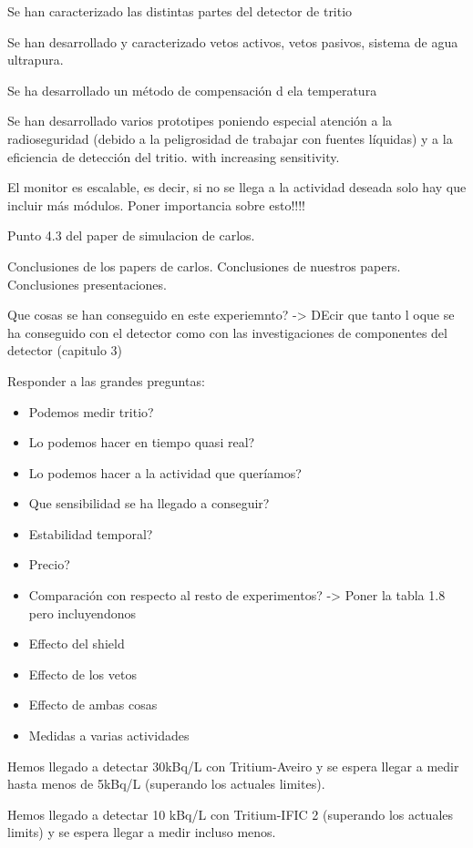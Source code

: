 Se han caracterizado las distintas partes del detector de tritio

Se han desarrollado y caracterizado vetos activos, vetos pasivos, sistema de agua ultrapura.

Se ha desarrollado un método de compensación d ela temperatura

Se han desarrollado varios prototipes poniendo especial atención a la radioseguridad (debido a la peligrosidad de trabajar con fuentes líquidas) y a la eficiencia de detección del tritio. with increasing sensitivity.

El monitor es escalable, es decir, si no se llega a la actividad deseada solo hay que incluir más módulos. Poner importancia sobre esto!!!!

Punto 4.3 del paper de simulacion de carlos.

Conclusiones de los papers de carlos.
Conclusiones de nuestros papers.
Conclusiones presentaciones.

Que cosas se han conseguido en este experiemnto? -> DEcir que tanto l oque se ha conseguido con el detector como con las investigaciones de componentes del detector (capitulo 3)

Responder a las grandes preguntas: 
\begin{itemize}
\item{} Podemos medir tritio? 
\item{} Lo podemos hacer en tiempo quasi real? 
\item{}Lo podemos hacer a la actividad que queríamos? 
\item{} Que sensibilidad se ha llegado a conseguir?
\item{} Estabilidad temporal?
\item{} Precio?
\item{} Comparación con respecto al resto de experimentos? -> Poner la tabla 1.8 pero incluyendonos
\item{} Effecto del shield
\item{} Effecto de los vetos
\item{} Effecto de ambas cosas
\item{} Medidas a varias actividades
\end{itemize}


Hemos llegado a detectar 30kBq/L con Tritium-Aveiro y se espera llegar a medir hasta menos de 5kBq/L (superando los actuales limites).

Hemos llegado a detectar 10 kBq/L con Tritium-IFIC 2 (superando los actuales limits) y se espera llegar a medir incluso menos.

